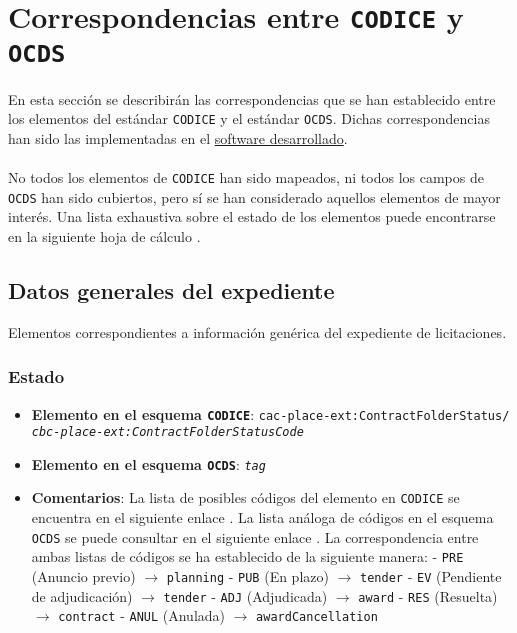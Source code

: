 \section{Correspondencias entre \texttt{CODICE} y \texttt{OCDS}}

    En esta sección se describirán las correspondencias que se han establecido entre los elementos del estándar \texttt{CODICE} y el estándar \texttt{OCDS}. Dichas correspondencias han sido las implementadas en el \hyperref[sec:software]{software desarrollado}.
    \\ \\
    No todos los elementos de \texttt{CODICE} han sido mapeados, ni todos los campos de \texttt{OCDS} han sido cubiertos, pero sí se han considerado aquellos elementos de mayor interés. Una lista exhaustiva sobre el estado de los elementos puede encontrarse en la siguiente hoja de cálculo \cite{CHECKLIST}.

    \vspace{0.3cm}
    
    \subsection{Datos generales del expediente}
    
    Elementos correspondientes a información genérica del expediente de licitaciones.
    
        \subsubsection{Estado}
            \begin{itemize}
                \item \textbf{Elemento en el esquema \texttt{CODICE}}:
                    \tabto{7.6cm} \texttt{cac-place-ext:ContractFolderStatus/} \\
                    \tabto{7.6cm} \texttt{\textit{cbc-place-ext:ContractFolderStatusCode}}
                \item \textbf{Elemento en el esquema \texttt{OCDS}}:
                    \tabto{7.6cm} \texttt{\textit{tag}}
                \item \textbf{Comentarios}: La lista de posibles códigos del elemento en \texttt{CODICE} se encuentra en el siguiente enlace \cite{CR1}.
                    La lista análoga de códigos en el esquema \texttt{OCDS} se puede consultar en el siguiente enlace \cite{CR2}.
                    La correspondencia entre ambas listas de códigos se ha establecido de la siguiente manera:
                        \subitem - \texttt{PRE} (Anuncio previo) $\rightarrow$ \texttt{planning}
                        \subitem - \texttt{PUB} (En plazo) $\rightarrow$ \texttt{tender}
                        \subitem - \texttt{EV} (Pendiente de adjudicación) $\rightarrow$ \texttt{tender}
                        \subitem - \texttt{ADJ} (Adjudicada) $\rightarrow$ \texttt{award}
                        \subitem - \texttt{RES} (Resuelta) $\rightarrow$ \texttt{contract}
                        \subitem - \texttt{ANUL} (Anulada) $\rightarrow$ \texttt{awardCancellation}
            \end{itemize}
        
